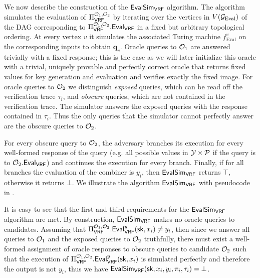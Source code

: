 We now describe the construction of the $\alg{EvalSim}{VRF}$ algorithm.
The algorithm simulates the evaluation of $\BBComb{VRF}[\O_1, \O_2]$ by iterating over
the vertices in $V(\mathcal{G}_{\text{Eval}})$ of the DAG corresponding to $\BBComb{VRF}[\O_1, \O_2].\alg{Eval}{VRF}$ in a fixed but arbitrary topological ordering.
At every vertex $v$ it simulates the associated Turing machine $f_{\text{Eval}}^v$ on the
corresponding inputs to obtain $\mathbf q_v$. 
Oracle queries to $\mathcal{O}_1$ are answered trivially with a fixed response;
this is the case as we will later initialize this oracle with a trivial, uniquely provable and perfectly
correct oracle that returns fixed values for key generation and evaluation and verifies exactly the fixed image.
For oracle queries to $\mathcal{O}_2$ we distinguish \textit{exposed} queries, which can be read off the verification 
trace $\tau_i$, and \textit{obscure} queries, which are not contained in the verification trace.
The simulator answers the exposed queries with the response contained in $\tau_i$.
Thus the only queries that the simulator cannot perfectly answer are the obscure queries to $\mathcal{O}_2$.

For every obscure query to $\mathcal{O}_2$, the adversary branches its execution for every well-formed response
of the query (e.g. all possible values in $\mathcal{Y} \times \mathcal{P}$ if the query is to $\O_2.\alg{Eval}{VRF}$) and
continues the execution for every branch. Finally, if for all branches the evaluation of the combiner is $y_i$,
then $\alg{EvalSim}{VRF}$ returns $\top$, otherwise it returns $\bot$.
We illustrate the algorithm $\alg{EvalSim}{VRF}$ with pseudocode in .

It is easy to see that the first and third requirements for the $\alg{EvalSim}{VRF}$ algorithm are met.
By construction, $\alg{EvalSim}{VRF}$ makes no oracle queries to candidates.
Assuming that $\BBComb{VRF}[\O_1, \O_2].\alg{Eval}{VRF}^y(\sk, x_i) \neq y_i$,
then since we answer all queries to $\mathcal{O}_1$ and the exposed queries to $\mathcal{O}_2$
truthfully, there must exist a well-formed assignment of oracle responses to 
obscure queries to candidate $\mathcal{O}_2$ such that the execution of 
$\BBComb{VRF}[\O_1, \O_2].\alg{Eval}{VRF}^y(\sk, x_i)$ is simulated perfectly 
and therefore the output is not $y_i$, thus we have $\alg{EvalSim}{VRF}(\sk, x_i, y_i, \pi_i, \tau_i) = \bot$.

